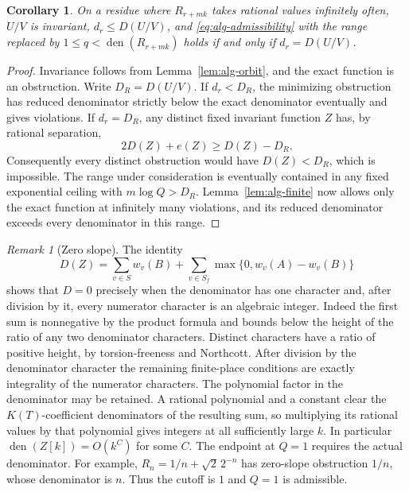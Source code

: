 \documentclass[11pt,a4paper,reqno]{amsart}
\newtheorem{corollary}[theorem]{Corollary}
\theoremstyle{definition}
\theoremstyle{remark}
\newtheorem{remark}[theorem]{Remark}
\numberwithin{equation}{section}
\begin{document}
\begin{corollary}\label{cor:alg-rational}
On a residue where \(R_{r+mk}\) takes rational values infinitely
often, \(U/V\) is invariant, \(d_r\le D(U/V)\), and
\eqref{eq:alg-admissibility} with the range replaced by
\(1\le q<\operatorname{den}(R_{r+mk})\) holds if and only if
\(d_r=D(U/V)\).
\end{corollary}

\begin{proof}
Invariance follows from Lemma~\ref{lem:alg-orbit}, and the exact
function is an obstruction. Write \(D_R=D(U/V)\).
If \(d_r<D_R\), the minimizing obstruction has reduced
denominator strictly below the exact denominator eventually and
gives violations. If \(d_r=D_R\), any distinct fixed invariant
function \(Z\) has, by rational separation,
\[
 2D(Z)+e(Z)\ge D(Z)-D_R.
\]
Consequently every distinct obstruction would have \(D(Z)<D_R\),
which is impossible. The range under consideration is eventually
contained in any fixed exponential ceiling with \(m\log Q>D_R\).
Lemma~\ref{lem:alg-finite} now allows only the exact function at
infinitely many violations, and its reduced denominator exceeds
every denominator in this range.
\end{proof}

\begin{remark}[Zero slope]\label{rem:alg-zero}
The identity
\[
 D(Z)=\sum_{v\in S}w_v(B)
       +\sum_{v\in S_f}\max\{0,w_v(A)-w_v(B)\}
\]
shows that \(D=0\) precisely when the denominator has one character
and, after division by it, every numerator character is an
algebraic integer. Indeed the first sum is nonnegative by the
product formula and bounds below the height of the ratio of any
two denominator characters. Distinct characters have a ratio of
positive height, by torsion-freeness and Northcott. After division
by the denominator character the remaining finite-place conditions
are exactly integrality of the numerator characters. The polynomial
factor in the denominator may be retained. A rational polynomial
and a constant clear the \(K(T)\)-coefficient denominators of
the resulting sum, so multiplying its rational values by that
polynomial gives integers at all sufficiently large \(k\).
In particular \(\operatorname{den}(Z[k])=O(k^C)\) for some \(C\).
The endpoint at \(Q=1\) requires the actual denominator. For example,
\(R_n=1/n+\sqrt{2}\,2^{-n}\) has zero-slope obstruction \(1/n\),
whose denominator is \(n\). Thus the cutoff is \(1\) and \(Q=1\)
is admissible.
\end{remark}
\end{document}
